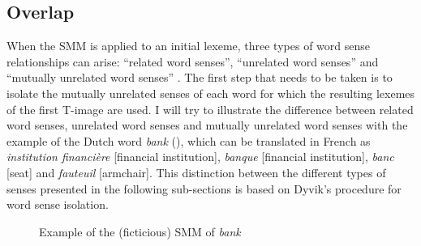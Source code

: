 \subsection{Overlap}
\label{sec:3.4.3}
When the SMM is applied to an initial lexeme, three types of word sense relationships can arise: “related word senses”, “unrelated word senses” and “mutually unrelated word senses” \citep[32]{langemets_translations_2005}. The first step that needs to be taken is to isolate the mutually unrelated senses of each word \citep[32]{langemets_translations_2005} for which the resulting lexemes of the first T-image are used. I will try to illustrate the difference between related word senses, unrelated word senses and mutually unrelated word senses with the example of the Dutch word \textit{bank} (), which can be translated in French as \textit{institution financière} [financial institution], \textit{banque} [financial institution], \textit{banc} [seat] and \textit{fauteuil} [armchair]. This distinction between the different types of senses presented in the following sub-sections is based on Dyvik’s procedure for word sense isolation.

\begin{figure}\scriptsize
\caption{\label{fig:3:9}Example of the (ficticious) SMM of \textit{bank}}
\end{figure}

